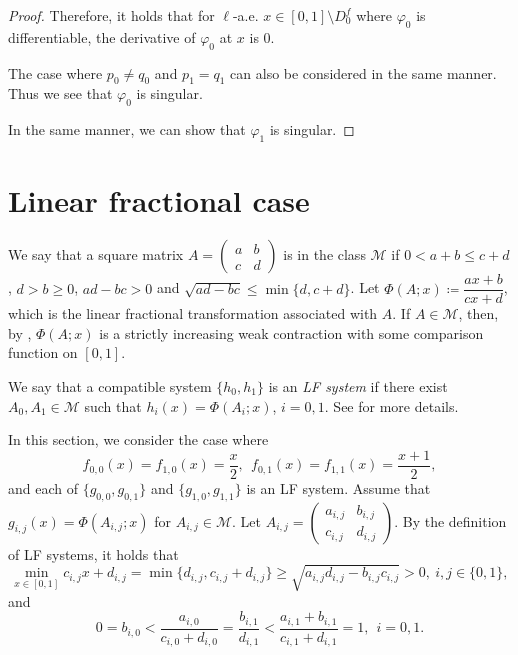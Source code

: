 \documentclass[a4paper, reqno, 11pt]{amsart}
\theoremstyle{definition}
\begin{document}
\begin{proof}
Therefore, it holds that  for $\ell$-a.e. $x\in [0,1] \setminus D^{f}_0$ where $\varphi_0$ is differentiable, 
the derivative of $\varphi_0$ at $x$ is $0$. 

The case where $p_0 \ne q_0$ and $p_1 = q_1$ can also be considered in the same manner. 
Thus we see that $\varphi_0$ is singular. 

In the same manner, we can show that $\varphi_1$ is singular. 
\end{proof}




\section{Linear fractional case}\label{sec:LF}


We say that a square matrix $A = \begin{pmatrix} a & b \\  c & d \end{pmatrix}$ is in the class $\mathscr{M}$ if 
$0 < a+b \le c+d$, $d > b \ge 0$, 
$ad - bc > 0$ and $\sqrt{ad-bc} \le \min\{d, c+d\}$. 
Let $\Phi(A;x) \coloneqq \dfrac{ax+b}{cx+d}$, which is the linear fractional transformation associated with $A$. 
If $A \in \mathscr{M}$, then, by \cite[Lemma 2.9]{Okamura2024}, 
$\Phi(A;x)$ is a strictly increasing weak contraction with some comparison function on $[0,1]$. 

We say that a compatible system $\{h_{0}, h_{1}\}$ is an {\it LF system} if there exist $A_0, A_1 \in \mathscr{M}$ such that $h_i (x) = \Phi(A_i; x)$, $i = 0,1$. 
See \cite[Subsection 2.3]{Okamura2024} for more details. 

In this section, 
we consider the case where 
\begin{equation}\label{eq:def-f-dyadic} 
f_{0,0}(x) = f_{1,0}(x) = \frac{x}{2}, \ \ f_{0,1}(x) = f_{1,1}(x) = \frac{x+1}{2}, 
\end{equation}
and each of $\{g_{0,0}, g_{0,1}\}$ and $\{g_{1,0}, g_{1,1}\}$ is an LF system. 
Assume that $g_{i,j}(x) = \Phi(A_{i,j}; x)$ for $A_{i,j} \in \mathscr{M}$. 
Let $A_{i,j} =  \begin{pmatrix} a_{i,j} & b_{i,j} \\  c_{i,j} & d_{i,j} \end{pmatrix}$. 
By the definition of LF systems, 
it holds that 
\begin{equation}\label{eq:cd-posi} 
\min_{x \in [0,1]} c_{i,j} x + d_{i,j} = \min\{d_{i,j}, c_{i,j} + d_{i,j}\} \ge \sqrt{a_{i,j} d_{i,j} - b_{i,j} c_{i,j}} > 0, \ i, j \in \{0,1\}, 
\end{equation} 
and 
\begin{equation}\label{eq:compatible-LF} 
0 = b_{i,0} < \dfrac{a_{i,0}}{c_{i,0} + d_{i,0}} = \dfrac{b_{i,1}}{d_{i,1}} < \frac{a_{i,1} + b_{i,1}}{c_{i,1} + d_{i,1}} = 1, \ \ i = 0,1.
\end{equation}  
\end{document}
